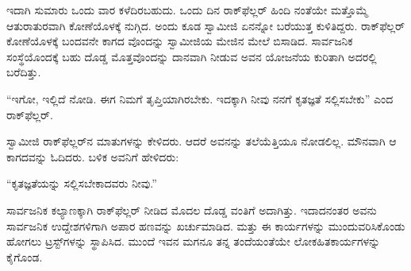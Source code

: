 ಇದಾಗಿ ಸುಮಾರು ಒಂದು ವಾರ ಕಳೆದಿರಬಹುದು. ಒಂದು ದಿನ ರಾಕ್​ಫೆಲ್ಲರ್ ಹಿಂದಿ ನಂತೆಯೇ ಮತ್ತೊಮ್ಮೆ ಆತುರಾತುರವಾಗಿ ಕೋಣೆಯೊಳಕ್ಕೆ ನುಗ್ಗಿದ. ಅಂದು ಕೂಡ ಸ್ವಾಮೀಜಿ ಏನನ್ನೋ ಬರೆಯುತ್ತ ಕುಳಿತಿದ್ದರು. ರಾಕ್​ಫೆಲ್ಲರ್ ಕೋಣೆಯೊಳಕ್ಕೆ ಬಂದವನೇ ಕಾಗದ ವೊಂದನ್ನು ಸ್ವಾಮೀಜಿಯ ಮೇಜಿನ ಮೇಲೆ ಬಿಸಾಡಿದ. ಸಾರ್ವಜನಿಕ ಸಂಸ್ಥೆಯೊಂದಕ್ಕೆ ಬಹು ದೊಡ್ಡ ಮೊತ್ತವೊಂದನ್ನು ದಾನವಾಗಿ ನೀಡುವ ಅವನ ಯೋಜನೆಯ ಕುರಿತಾಗಿ ಅದರಲ್ಲಿ ಬರೆದಿತ್ತು.

“ಇಗೋ, ಇಲ್ಲಿದೆ ನೋಡಿ. ಈಗ ನಿಮಗೆ ತೃಪ್ತಿಯಾಗಿರಬೇಕು. ಇದಕ್ಕಾಗಿ ನೀವು ನನಗೆ ಕೃತಜ್ಞತೆ ಸಲ್ಲಿಸಬೇಕು” ಎಂದ ರಾಕ್​ಫೆಲ್ಲರ್.

ಸ್ವಾಮೀಜಿ ರಾಕ್​ಫೆಲ್ಲರ್​ನ ಮಾತುಗಳನ್ನು ಕೇಳಿದರು. ಆದರೆ ಅವನನ್ನು ತಲೆಯೆತ್ತಿಯೂ ನೋಡಲಿಲ್ಲ. ಮೌನವಾಗಿ ಆ ಕಾಗದವನ್ನು ಓದಿದರು. ಬಳಿಕ ಅವನಿಗೆ ಹೇಳಿದರು:

“ಕೃತಜ್ಞತೆಯನ್ನು ಸಲ್ಲಿಸಬೇಕಾದವರು ನೀವು.”

ಸಾರ್ವಜನಿಕ ಕಲ್ಯಾಣಕ್ಕಾಗಿ ರಾಕ್​ಫೆಲ್ಲರ್ ನೀಡಿದ ಮೊದಲ ದೊಡ್ಡ ವಂತಿಗೆ ಅದಾಗಿತ್ತು. ಇದಾದನಂತರ ಅವನು ಸಾರ್ವಜನಿಕ ಉದ್ದೇಶಗಳಿಗಾಗಿ ಅಪಾರ ಹಣವನ್ನು ಖರ್ಚುಮಾಡಿದ. ಮತ್ತು ಈ ಕಾರ್ಯಗಳನ್ನು ಮುಂದುವರಿಸಿಕೊಂಡು ಹೋಗಲು ಟ್ರಸ್ಟ್​ಗಳನ್ನು ಸ್ಥಾಪಿಸಿದ. ಮುಂದೆ ಇವನ ಮಗನೂ ತನ್ನ ತಂದೆಯಂತೆಯೇ ಲೋಕಹಿತಕಾರ್ಯಗಳನ್ನು ಕೈಗೊಂಡ.

